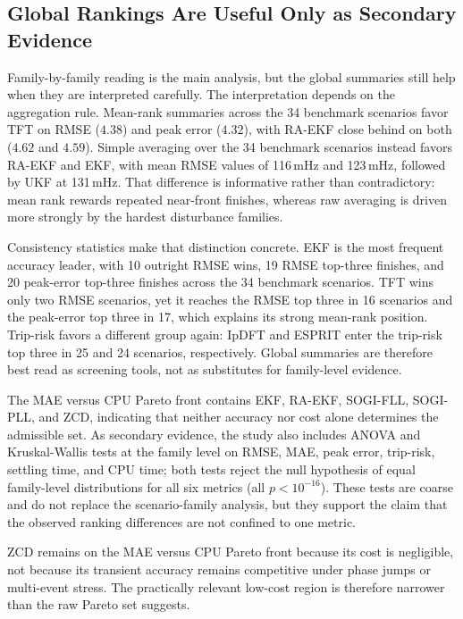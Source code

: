 \subsection{Global Rankings Are Useful Only as Secondary Evidence}

Family-by-family reading is the main analysis, but the global summaries still
help when they are interpreted carefully. The interpretation depends on the
aggregation rule. Mean-rank summaries across the 34 benchmark scenarios favor
TFT on RMSE ($4.38$) and peak error
($4.32$), with RA-EKF close behind on both ($4.62$ and $4.59$). Simple
averaging over the 34 benchmark scenarios instead favors RA-EKF and EKF,
with mean RMSE values of 116\,mHz and 123\,mHz, followed by UKF at 131\,mHz.
That difference is informative rather than contradictory: mean rank rewards
repeated near-front finishes, whereas raw averaging is driven more strongly by
the hardest disturbance families.

Consistency statistics make that distinction concrete. EKF is the most frequent
accuracy leader, with 10 outright RMSE wins, 19 RMSE top-three finishes, and
20 peak-error top-three finishes across the 34 benchmark scenarios. TFT wins
only two RMSE scenarios, yet it reaches the RMSE top three in 16 scenarios and
the peak-error top three in 17, which explains its strong mean-rank position.
Trip-risk favors a different group again: IpDFT and ESPRIT enter the trip-risk
top three in 25 and 24 scenarios, respectively. Global summaries are therefore
best read as screening tools, not as substitutes for family-level evidence.

The MAE versus CPU Pareto front contains EKF, RA-EKF, SOGI-FLL, SOGI-PLL, and
ZCD, indicating that neither accuracy nor cost alone determines the admissible
set. As secondary evidence, the study
also includes ANOVA and Kruskal-Wallis tests at the family level on RMSE, MAE, peak error,
trip-risk, settling time, and CPU time; both tests reject the null hypothesis
of equal family-level distributions for all six metrics (all $p<10^{-16}$).
These tests are coarse
and do not replace the scenario-family analysis, but they support the claim
that the observed ranking differences are not confined to one metric.

ZCD remains on the MAE versus CPU Pareto front because its cost is negligible,
not because its transient accuracy remains competitive under phase jumps or
multi-event stress. The practically relevant low-cost region is therefore
narrower than the raw Pareto set suggests.

